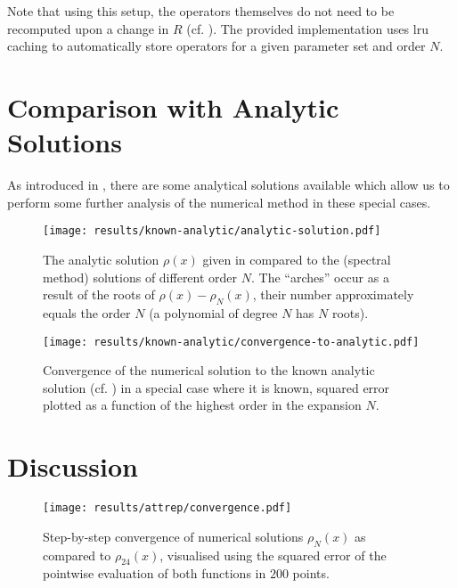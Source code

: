 Note that using this setup, the operators themselves do not need to be recomputed upon a change in $R$ (cf. ).
The provided implementation uses \gls{lru} caching to automatically store operators for a given parameter set and order $N$.

\section{Comparison with Analytic Solutions}
As introduced in , there are some analytical solutions available which allow us to perform some further analysis of the numerical method in these special cases.

\begin{figure}[H]
  \centering
  \label{fig:analytic-solution}
  \texttt{[image: results/known-analytic/analytic-solution.pdf]}
  \caption[Comparison with analytical solutions and error]{
    The analytic solution $\rho(x)$ given in  compared to the (spectral method) solutions of different order $N$.
    The ``arches'' occur as a result of the roots of $\rho(x) - \rho_N(x)$, their number approximately equals the order $N$ (a polynomial of degree $N$ has $N$ roots).
  }
\end{figure}



\begin{figure}[H]
  \centering
  \label{fig:convergence-to-analytic}
  \texttt{[image: results/known-analytic/convergence-to-analytic.pdf]}
  \caption[Convergence to analytic solution]{Convergence of the numerical solution to the known analytic solution (cf. ) in a special case where it is known, squared error plotted as a function of the highest order in the expansion $N$.}
\end{figure}

\section{Discussion}
\begin{figure}[H]
  \centering
  \label{fig:convergence}
  \texttt{[image: results/attrep/convergence.pdf]}
  \caption[Step-by-step convergence of solutions compared to order 24]{Step-by-step convergence of numerical solutions $\rho_N(x)$ as compared to $\rho_{24}(x)$, visualised using the squared error of the pointwise evaluation of both functions in $200$ points.}
\end{figure}

